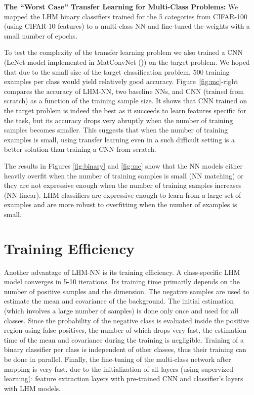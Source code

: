 \documentclass[twoside,11pt]{article}
\begin{document}
\noindent\textbf{The ``Worst Case'' Transfer Learning for Multi-Class Problems:}
We mapped the LHM binary classifiers trained for the 5 categories from CIFAR-100 (using CIFAR-10 features) to a multi-class NN and fine-tuned the weights with a small number of epochs.

To test the complexity of the transfer learning problem we also trained a CNN (LeNet model implemented in MatConvNet (\cite{vedaldi15matconvnet})) on the target problem. We hoped that due to the small size of the target classification problem, 500 training examples per class would  yield relatively good accuracy. Figure~\ref{fig:mc}-right compares the accuracy of LHM-NN, two baseline NNs, and CNN (trained from scratch) as a function of the training sample size. It shows that CNN trained on the target problem is indeed the best as it succeeds to learn features specific for the task, but its accuracy drops very abruptly when the number of training samples becomes smaller. This suggests that when the number of training examples is small, using transfer learning even in a such difficult setting is a better solution than training a CNN from scratch.

The results in Figures \ref{fig:binary} and \ref{fig:mc} show that the NN models either heavily overfit when the number of  training samples is small (NN matching) or they are not expressive enough when the number of training samples increases (NN linear). LHM classifiers are expressive enough to learn from a large set of examples and are more robust to overfitting when the number of examples is small.



\section{Training Efficiency}
Another advantage of LHM-NN is its training efficiency. A class-specific LHM model converges in 5-10 iterations. Its training time primarily depends on the number of positive samples and the dimension. The negative samples are used to estimate the mean and covariance of the background. The initial estimation (which involves a large number of samples) is done only once and used for all classes. Since the probability of the negative class is evaluated inside the positive region using false positives, the number of which drops very fast, the estimation time of the mean and covariance during the training is negligible. Training of a binary classifier per class is independent of other classes, thus their training can be done in parallel. Finally, the fine-tuning of the multi-class network after mapping is very fast, due to the initialization of all layers (using supervized learning): feature extraction layers with pre-trained CNN and classifier's layers with LHM models.
\end{document}
